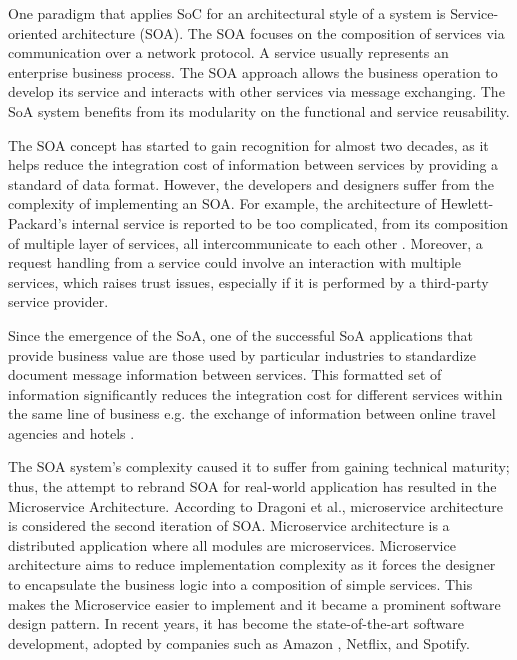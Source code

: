 One paradigm that applies SoC for an architectural style of a system is  Service-oriented architecture (SOA). The SOA focuses on the composition of services via communication over a network protocol. A service usually represents an enterprise business process. The SOA approach allows the business operation to develop its service and interacts with other services via message exchanging. The SoA system benefits from its modularity on the functional and service reusability\cite{SOAopengroup}.

The SOA concept has started to gain recognition for almost two decades, as it helps reduce the integration cost of information between services by providing a standard of data format. However, the developers and designers suffer from the complexity of implementing an SOA. For example, the architecture of Hewlett-Packard's internal service is reported to be too complicated, from its composition of multiple layer of services, all intercommunicate to each other \cite{davenport-2016}. Moreover, a request handling from a service could involve an interaction with multiple services, which raises trust issues, especially if it is performed by a third-party service provider.

Since the emergence of the SoA, one of the successful SoA applications that provide business value are those used by particular industries to standardize document message information between services. This formatted set of information significantly reduces the integration cost for different services within the same line of business e.g. the exchange of information between online travel agencies and hotels
\cite{opentravel-2017,htng}.

The SOA system's complexity caused it to suffer from gaining technical maturity; thus, the attempt to rebrand SOA for real-world application has resulted in the Microservice Architecture. According to Dragoni et al., microservice architecture is considered the second iteration of SOA. Microservice architecture is a distributed application where all modules are microservices\cite{Dragoni2017}. Microservice architecture aims to reduce implementation complexity as it forces the designer to encapsulate the business logic into a composition of simple services. This makes the Microservice easier to implement and it became a prominent software design pattern. In recent years, it has become the state-of-the-art software development, adopted by companies such as Amazon \cite{iii-2015}, Netflix\cite{blog-2018}, and Spotify\cite{cope-2020}.

